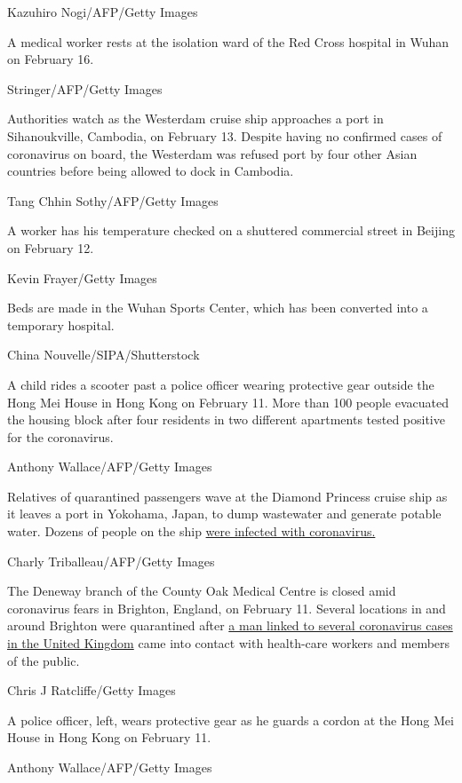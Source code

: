 Kazuhiro Nogi/AFP/Getty Images

A medical worker rests at the isolation ward of the Red Cross hospital
in Wuhan on February 16.

Stringer/AFP/Getty Images

Authorities watch as the Westerdam cruise ship approaches a port in
Sihanoukville, Cambodia, on February 13. Despite having no confirmed
cases of coronavirus on board, the Westerdam was refused port by four
other Asian countries before being allowed to dock in Cambodia.

Tang Chhin Sothy/AFP/Getty Images

A worker has his temperature checked on a shuttered commercial street in
Beijing on February 12.

Kevin Frayer/Getty Images

Beds are made in the Wuhan Sports Center, which has been converted into
a temporary hospital.

China Nouvelle/SIPA/Shutterstock

A child rides a scooter past a police officer wearing protective gear
outside the Hong Mei House in Hong Kong on February 11. More than 100
people evacuated the housing block after four residents in two different
apartments tested positive for the coronavirus.

Anthony Wallace/AFP/Getty Images

Relatives of quarantined passengers wave at the Diamond Princess cruise
ship as it leaves a port in Yokohama, Japan, to dump wastewater and
generate potable water. Dozens of people on the ship
\href{https://www.cnn.com/2020/02/10/us/coronavirus-cruise-ship-americans-quarantine/index.html}{were
infected with coronavirus.}

Charly Triballeau/AFP/Getty Images

The Deneway branch of the County Oak Medical Centre is closed amid
coronavirus fears in Brighton, England, on February 11. Several
locations in and around Brighton were quarantined after
\href{https://www.cnn.com/2020/02/11/europe/steve-walsh-uk-coronavirus-patient-intl-gbr/index.html}{a
man linked to several coronavirus cases in the United Kingdom} came into
contact with health-care workers and members of the public.

Chris J Ratcliffe/Getty Images

A police officer, left, wears protective gear as he guards a cordon at
the Hong Mei House in Hong Kong on February 11.

Anthony Wallace/AFP/Getty Images

